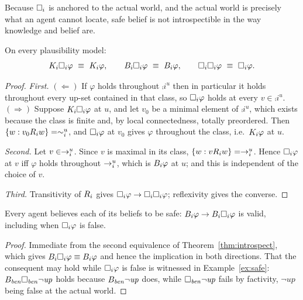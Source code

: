 \documentclass[11pt,a4paper]{article}
\begin{document}
Because $\Box_{i}$ is anchored to the actual world, and the actual world is precisely what an
agent cannot locate, safe belief is not introspectible in the way knowledge and belief are.

\begin{theorem}
\label{thm:introspect}
On every plausibility model:
\[
  \Kop{i}\Sop{i}\varphi \ \equiv\ \Kop{i}\varphi,
  \qquad
  \Bop{i}\Sop{i}\varphi \ \equiv\ \Bop{i}\varphi,
  \qquad
  \Sop{i}\Sop{i}\varphi \ \equiv\ \Sop{i}\varphi .
\]
\end{theorem}

\begin{proof}
\emph{First.} $(\Leftarrow)$ If $\varphi$ holds throughout $\comp{i}^{u}$ then in particular it
holds throughout every up-set contained in that class, so $\Box_{i}\varphi$ holds at every $v
\in \comp{i}^{u}$. $(\Rightarrow)$ Suppose $K_{i}\Box_{i}\varphi$ at $u$, and let $v_0$ be a
minimal element of $\comp{i}^{u}$, which exists because the class is finite and, by local
connectedness, totally preordered. Then $\{w : v_0 R_{i} w\} = \sim_{i}^{u}$, and
$\Box_{i}\varphi$ at $v_0$ gives $\varphi$ throughout the class, i.e.\ $K_{i}\varphi$ at $u$.

\emph{Second.} Let $v \in \rightarrow_{i}^{u}$. Since $v$ is maximal in its class, $\{w : v R_{i}
w\} = \rightarrow_{i}^{u}$. Hence $\Box_{i}\varphi$ at $v$ iff $\varphi$ holds throughout
$\rightarrow_{i}^{u}$, which is $B_{i}\varphi$ at $u$; and this is independent of the choice of $v$.

\emph{Third.} Transitivity of $R_{i}$ gives $\Box_{i}\varphi \to \Box_{i}\Box_{i}\varphi$;
reflexivity gives the converse.
\end{proof}

\begin{corollary}[Overconfidence]
\label{cor:overconfident}
Every agent believes each of its beliefs to be safe: $B_{i}\varphi \to
B_{i}\Box_{i}\varphi$ is valid, including when $\Box_{i}\varphi$ is false.
\end{corollary}

\begin{proof}
Immediate from the second equivalence of Theorem~\ref{thm:introspect}, which gives
$B_{i}\Box_{i}\varphi \equiv B_{i}\varphi$ and hence the implication in both directions.
That the consequent may hold while $\Box_{i}\varphi$ is false is witnessed in
Example~\ref{ex:safe}: $B_{\mathit{ben}}\Box_{\mathit{ben}}\neg\mathit{up}$ holds because
$B_{\mathit{ben}}\neg\mathit{up}$ does, while $\Box_{\mathit{ben}}\neg\mathit{up}$ fails by
factivity, $\neg\mathit{up}$ being false at the actual world.
\end{proof}
\end{document}
